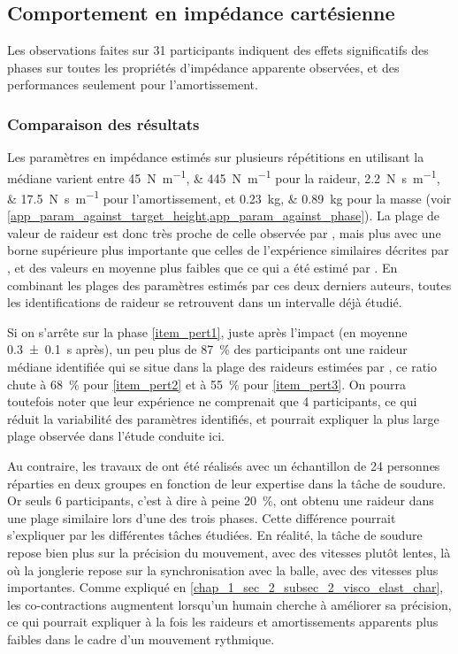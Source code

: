 \subsection{Comportement en impédance cartésienne}

Les observations faites sur 31 participants indiquent des effets significatifs des phases sur toutes les propriétés d'impédance apparente observées, et des performances seulement pour l'amortissement. 

\subsubsection{Comparaison des résultats} \label{chap4_sec_res_sub_discussion_1}

Les paramètres en impédance estimés sur plusieurs répétitions en utilisant la médiane varient entre \SIlist{45;445}{\newton\per\meter} pour la raideur, \SIlist{2.2;17.5}{\newton\second\per\meter} pour l'amortissement, et \SIlist{0.23;0.89}{\kilogram} pour la masse (voir \cref{app_param_against_target_height,app_param_against_phase}). La plage de valeur de raideur est donc très proche de celle observée par \textcite{tsuji_human_1995}, mais plus avec une borne supérieure plus importante que celles de l'expérience similaires décrites par \textcite{tsuji_bio-mimetic_2008}, et des valeurs en moyenne plus faibles que ce qui a été estimé par \textcite{erden_hand_2015}. En combinant les plages des paramètres estimés par ces deux derniers auteurs, toutes les identifications de raideur se retrouvent dans un intervalle déjà étudié.

Si on s'arrête sur la phase \cref{item_pert1}, juste après l'impact (en moyenne \SI{0.3\pm0.1}{\second} après), un peu plus de \SI{87}{\percent} des participants ont une raideur médiane identifiée qui se situe dans la plage des raideurs estimées par \textcite{tsuji_bio-mimetic_2008}, ce ratio chute à \SI{68}{\percent} pour \cref{item_pert2} et à \SI{55}{\percent} pour \cref{item_pert3}. On pourra toutefois noter que leur expérience ne comprenait que 4 participants, ce qui réduit la variabilité des paramètres identifiés, et pourrait expliquer la plus large plage observée dans l'étude conduite ici. 

Au contraire, les travaux de \textcite{erden_hand_2015} ont été réalisés avec un échantillon de 24 personnes réparties en deux groupes en fonction de leur expertise dans la tâche de soudure. Or seuls 6 participants, c'est à dire à peine \SI{20}{\percent}, ont obtenu une raideur dans une plage similaire lors d'une des trois phases. Cette différence pourrait s'expliquer par les différentes tâches étudiées. En réalité, la tâche de soudure repose bien plus sur la précision du mouvement, avec des vitesses plutôt lentes, là où la jonglerie repose sur la synchronisation avec la balle, avec des vitesses plus importantes. Comme expliqué en \cref{chap_1_sec_2_subsec_2_visco_elast_char}, les co-contractions augmentent lorsqu'un humain cherche à améliorer sa précision, ce qui pourrait expliquer à la fois les raideurs et amortissements apparents plus faibles dans le cadre d'un mouvement rythmique.

